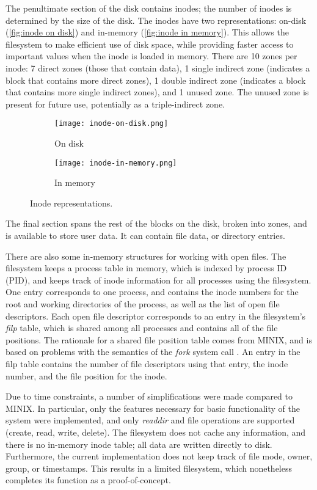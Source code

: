 The penultimate section of the disk contains inodes; the number of inodes is determined by the size of the disk.
The inodes have two representations: on-disk (\autoref{fig:inode on disk}) and in-memory (\autoref{fig:inode in memory}).
This allows the filesystem to make efficient use of disk space, while providing faster access to important values when the inode is loaded in memory.
There are 10 zones per inode: 7 direct zones (those that contain data), 1 single indirect zone (indicates a block that contains more direct zones), 1 double indirect zone (indicates a block that contains more single indirect zones), and 1 unused zone.
The unused zone is present for future use, potentially as a triple-indirect zone.

\begin{figure}[tb]
     \centering
     \begin{subfigure}[b]{0.45\textwidth}
         \centering
         \texttt{[image: inode-on-disk.png]}
         \caption{On disk}
         \label{fig:inode on disk}
     \end{subfigure}
     \begin{subfigure}[b]{0.45\textwidth}
         \centering
         \texttt{[image: inode-in-memory.png]}
         \caption{In memory}
         \label{fig:inode in memory}
     \end{subfigure}
     \caption{Inode representations.}
     \label{fig:inode representations}
\end{figure}


The final section spans the rest of the blocks on the disk, broken into zones, and is available to store user data.
It can contain file data, or directory entries.

There are also some in-memory structures for working with open files.
The filesystem keeps a process table in memory, which is indexed by process ID (PID), and keeps track of inode information for all processes using the filesystem.
One entry corresponds to one process, and contains the inode numbers for the root and working directories of the process, as well as the list of open file descriptors.
Each open file descriptor corresponds to an entry in the filesystem's \textit{filp} table, which is shared among all processes and contains all of the file positions.
The rationale for a shared file position table comes from MINIX, and is based on problems with the semantics of the \textit{fork} system call \cite{tanenbaum1997}.
An entry in the filp table contains the number of file descriptors using that entry, the inode number, and the file position for the inode.

Due to time constraints, a number of simplifications were made compared to MINIX.
In particular, only the features necessary for basic functionality of the system were implemented, and only \textit{readdir} and file operations are supported (create, read, write, delete).
The filesystem does not cache any information, and there is no in-memory inode table; all data are written directly to disk.
Furthermore, the current implementation does not keep track of file mode, owner, group, or timestamps.
This results in a limited filesystem, which nonetheless completes its function as a proof-of-concept.
